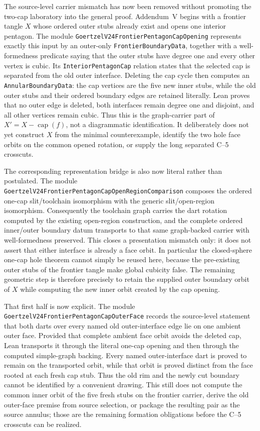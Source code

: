 \documentclass[11pt]{article}
\theoremstyle{definition}
\begin{document}
The source-level carrier mismatch has now been removed without promoting the
two-cap laboratory into the general proof.  Addendum~V begins with a frontier
tangle $X$ whose ordered outer stubs already exist and opens one interior
pentagon.  The module
\texttt{GoertzelV24FrontierPentagonCapOpening} represents exactly this input by
an outer-only \texttt{FrontierBoundaryData}, together with a well-formedness
predicate saying that the outer stubs have degree one and every other vertex
is cubic.  Its \texttt{InteriorPentagonCap} relation states that the selected
cap is separated from the old outer interface.  Deleting the cap cycle then
computes an \texttt{AnnularBoundaryData}: the cap vertices are the five new
inner stubs, while the old outer stubs and their ordered boundary edges are
retained literally.  Lean proves that no outer edge is deleted, both interfaces
remain degree one and disjoint, and all other vertices remain cubic.  Thus this
is the graph-carrier part of $X'=X-\operatorname{cap}(f)$, not a diagrammatic
identification.  It deliberately does not yet construct $X$ from the minimal
counterexample, identify the two hole face orbits on the common opened
rotation, or supply the long separated C--5 crosscuts.

The corresponding representation bridge is also now literal rather than
postulated.  The module
\texttt{GoertzelV24FrontierPentagonCapOpenRegionComparison} composes the
ordered one-cap slit/toolchain isomorphism with the generic slit/open-region
isomorphism.  Consequently the toolchain graph carries the dart rotation
computed by the existing open-region construction, and the complete ordered
inner/outer boundary datum transports to that same graph-backed carrier with
well-formedness preserved.  This closes a presentation mismatch only: it does
not assert that either interface is already a face orbit.  In particular the
closed-sphere one-cap hole theorem cannot simply be reused here, because the
pre-existing outer stubs of the frontier tangle make global cubicity false.
The remaining geometric step is therefore precisely to retain the supplied
outer boundary orbit of $X$ while computing the new inner orbit created by
the cap opening.

That first half is now explicit.  The module
\texttt{GoertzelV24FrontierPentagonCapOuterFace} records the source-level
statement that both darts over every named old outer-interface edge lie on
one ambient outer face.  Provided that complete ambient face orbit avoids the
deleted cap, Lean transports it through the literal one-cap opening and then
through the computed simple-graph backing.  Every named outer-interface dart
is proved to remain on the transported orbit, while that orbit is proved
distinct from the face rooted at each fresh cap stub.  Thus the old rim and
the newly cut boundary cannot be identified by a convenient drawing.  This
still does not compute the common inner orbit of the five fresh stubs on the
frontier carrier, derive the old outer-face premise from source selection, or
package the resulting pair as the source annulus; those are the remaining
formation obligations before the C--5 crosscuts can be realized.
\end{document}
